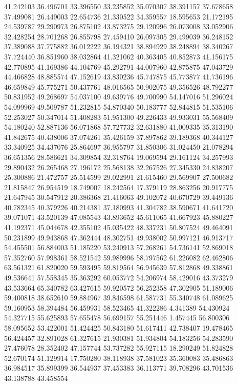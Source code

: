 41.242103
36.496701
33.396550
33.235852
35.070307
38.391157
37.678658
37.499081
26.449003
22.654736
21.330522
34.359557
18.595653
21.172195
24.539787
29.290973
26.875102
43.873275
29.120996
26.073008
33.052906
32.428254
28.701268
26.855798
27.459410
26.097305
29.499039
36.248152
37.389088
37.775882
36.012222
36.194321
38.894929
38.248894
38.340267
37.724440
36.851960
38.032864
41.321062
40.363405
40.852873
41.156175
42.770895
41.169386
44.104769
45.292791
44.007960
42.875875
47.043729
44.466828
48.885574
47.152619
43.830236
45.747875
45.773877
41.736196
46.659849
45.775271
50.437761
48.016565
50.902075
49.356526
48.792277
50.831952
49.268697
54.037100
49.639776
49.700990
54.147016
51.296024
54.099969
49.509787
51.232815
54.870340
50.183777
52.844815
51.535106
52.253027
50.347014
51.408283
51.951300
49.226433
49.933031
55.568409
54.180240
52.887136
56.071868
57.727732
32.631880
41.009335
35.313190
41.842675
40.438006
37.074261
35.426159
37.897862
39.189368
40.344127
33.340925
34.437076
25.864697
36.955797
31.850306
31.024450
21.078294
36.651356
28.586621
34.309854
32.318764
19.069594
29.161124
34.257993
29.890432
26.265468
27.196172
25.568138
32.267526
27.345330
24.838207
25.300886
21.472757
25.514599
29.022991
21.615460
29.569907
27.500682
21.815847
26.954519
18.749007
18.242564
17.379119
28.863256
20.917775
21.647945
30.547912
20.386368
21.416063
49.102072
40.670729
39.449136
40.782345
40.379226
40.214381
37.180993
41.304782
38.590671
41.641720
39.071071
43.520139
47.085543
43.893652
45.611065
41.667923
45.880227
41.192371
45.044678
42.355102
45.035422
48.337231
50.807524
49.464091
50.231899
49.943868
47.362444
48.302751
49.938002
50.997121
46.913717
54.455501
56.884003
51.185220
53.240913
57.268261
54.736141
52.869018
57.352760
57.998361
58.521542
59.989996
58.797562
61.226082
62.462806
63.561321
61.820020
59.593495
59.819564
56.945639
57.812868
49.338861
49.536641
57.558345
35.363292
60.053772
54.206974
58.429016
43.373279
43.533664
65.340782
63.427615
59.920572
56.252358
47.302905
51.189006
59.400818
38.652610
59.884967
39.846598
61.587731
55.340748
61.089625
59.160953
58.394484
56.459931
58.523465
41.322286
4.341389
54.430924
54.327715
55.625893
57.655478
56.699157
55.251446
1.457445
56.800306
58.095652
53.422001
51.424425
50.843180
51.617411
42.738407
19.478465
56.424457
32.891028
61.327615
21.930381
51.934804
54.183256
54.283590
27.476078
28.352402
47.157744
53.737282
55.927115
18.290249
51.824828
52.670174
51.129914
17.750280
38.118938
37.581023
35.360083
35.486863
36.984517
35.899399
36.544937
37.453383
36.113771
39.708296
43.701536
43.138788
43.458554
